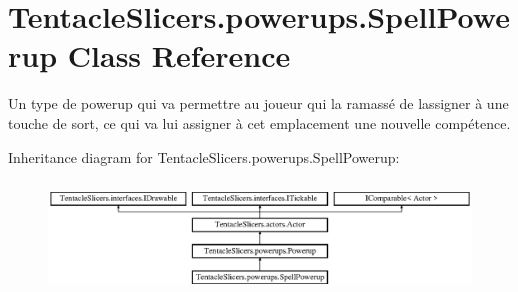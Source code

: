 \hypertarget{class_tentacle_slicers_1_1powerups_1_1_spell_powerup}{}\section{Tentacle\+Slicers.\+powerups.\+Spell\+Powerup Class Reference}
\label{class_tentacle_slicers_1_1powerups_1_1_spell_powerup}


Un type de powerup qui va permettre au joueur qui l\textquotesingle{}a ramassé de l\textquotesingle{}assigner à une touche de sort, ce qui va lui assigner à cet emplacement une nouvelle compétence.  


Inheritance diagram for Tentacle\+Slicers.\+powerups.\+Spell\+Powerup\+:\begin{figure}[H]
\begin{center}
\leavevmode
\includegraphics[height=3.010753cm]{class_tentacle_slicers_1_1powerups_1_1_spell_powerup}
\end{center}
\end{figure}
